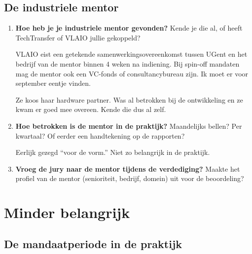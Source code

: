 \documentclass[11pt,a4paper]{article}
\newcommand{\notebox}{%
\begin{tcolorbox}[colback=notebg, colframe=noteborder, boxrule=0.5pt, arc=2pt, left=4pt, right=4pt, top=2pt, bottom=2pt]
\vspace{2.2cm}
\end{tcolorbox}
}
\newcommand{\filledbox}[1]{%
\begin{tcolorbox}[colback=notebg, colframe=noteborder, boxrule=0.5pt, arc=2pt, left=4pt, right=4pt, top=2pt, bottom=2pt]
#1
\end{tcolorbox}
}
\begin{document}
\subsection{De industriele mentor}

\begin{enumerate}[resume]

\item \textbf{Hoe heb je je industriele mentor gevonden?} Kende je die al, of heeft TechTransfer of VLAIO jullie gekoppeld?

VLAIO eist een getekende samenwerkingsovereenkomst tussen UGent en het bedrijf van de mentor binnen 4 weken na indiening. Bij spin-off mandaten mag de mentor ook een VC-fonds of consultancybureau zijn. Ik moet er voor september eentje vinden.

\filledbox{Ze koos haar hardware partner. Was al betrokken bij de ontwikkeling en ze kwam er goed mee overeen. Kende die dus al zelf.}

\item \textbf{Hoe betrokken is de mentor in de praktijk?} Maandelijks bellen? Per kwartaal? Of eerder een handtekening op de rapporten?

\filledbox{Eerlijk gezegd ``voor de vorm.'' Niet zo belangrijk in de praktijk.}

\item \textbf{Vroeg de jury naar de mentor tijdens de verdediging?} Maakte het profiel van de mentor (senioriteit, bedrijf, domein) uit voor de beoordeling?

\notebox

\end{enumerate}

\section{Minder belangrijk}

\subsection{De mandaatperiode in de praktijk}
\end{document}
